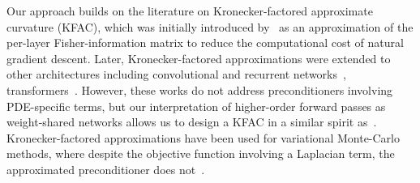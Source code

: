 Our approach builds on the literature on Kronecker-factored approximate curvature (KFAC), which was initially introduced by~\citet{heskes2000natural, martens2010deep} as an approximation of the per-layer Fisher-information matrix to reduce the computational cost of natural gradient descent. %
Later, Kronecker-factored approximations were extended to other architectures including convolutional and recurrent networks~\citep{grosse2016kroneckerfactored, martens2018kroneckerfactored}, transformers~\citep{zhang2019algorithmic, pauloski2021kaisa, osawa2023pipefisher, grosse2023studying}. %
However, these works do not address preconditioners involving PDE-specific terms, but our interpretation of higher-order forward passes as weight-shared networks allows us to design a KFAC in a similar spirit as~\cite{eschenhagen2023kroneckerfactored}.
Kronecker-factored approximations have been used for variational Monte-Carlo methods, where despite the objective function involving a Laplacian term, the approximated preconditioner does not~\citep{pfau2020ab,drissi2024second}.



